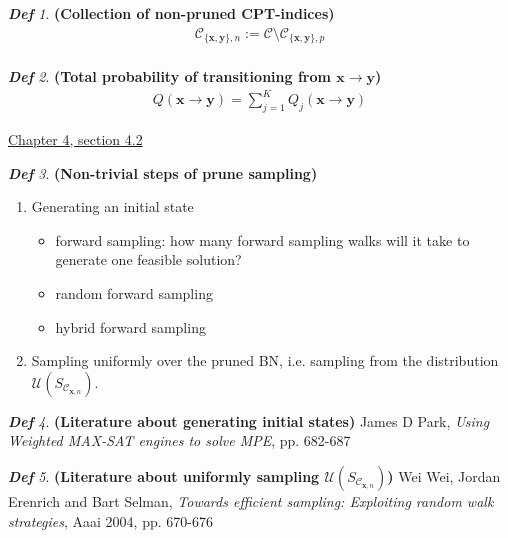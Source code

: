 \documentclass{amsart}
\theoremstyle{plain}
\theoremstyle{remark}
\newtheorem*{definition*}{\textbf{\em Def}}
\theoremstyle{plain}
\newcommand{\C}{{\mathcal C}}
\newcommand{\U}{{\mathcal{U}}}
\newcommand{\bfx}{{\mathbf{x}}}
\newcommand{\bfy}{{\mathbf{y}}}
\newcommand{\vs}{\vspace{0.75pc}}
\begin{document}
\begin{definition*}\textbf{ (Collection of non-pruned CPT-indices) }
\begin{align*}
\C_{\{\bfx,\bfy\},n}:=\C \setminus \C_{\{\bfx,\bfy\},p}\\
\end{align*}
\end{definition*}\vs 

\begin{definition*}\textbf{ (Total probability of transitioning from $\bfx \to \bfy$) }
\begin{align*}
Q(\bfx \to \bfy) = \sum_{j=1}^K Q_j(\bfx \to \bfy)
\end{align*}
\end{definition*}\vs 

\underline{Chapter 4, section 4.2} \\
\begin{definition*}\textbf{ (Non-trivial steps of prune sampling) }
\begin{enumerate}[1)]
\item Generating an initial state
\begin{itemize}
\item forward sampling: how many forward sampling walks will it take to generate one feasible solution?
\item random forward sampling
\item hybrid forward sampling 
\end{itemize}
\item Sampling uniformly over the pruned BN, i.e. sampling from the distribution $\U(S_{\C_{\bfx,n}})$.
\end{enumerate}
\end{definition*}\vs 

\begin{definition*}\textbf{ (Literature about generating initial states) } \newline
[18] James D Park, \textit{Using Weighted MAX-SAT engines to solve MPE}, pp. 682-687
\end{definition*}\vs 

\begin{definition*}\textbf{ (Literature about uniformly sampling $\U(S_{\C_{\bfx,n}})
$) } \newline
[28] Wei Wei, Jordan Erenrich and Bart Selman, \textit{Towards efficient sampling: Exploiting random walk strategies}, Aaai 2004, pp. 670-676
\end{definition*}\vs 
\end{document}
